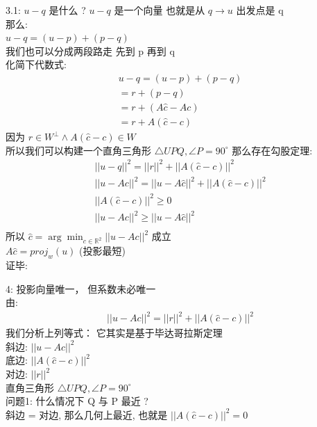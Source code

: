\documentclass[12pt]{article}
\begin{document}
\begin{flushleft}
    3.1: $u -q$ 是什么 ?
    $u - q$ 是一个向量 也就是从 $q \to u $ 出发点是 q \\
    那么: \\
    $u - q = (u - p)  + (p - q) $  \\
    我们也可以分成两段路走 先到 p 再到 q \\
    化简下代数式: \\
    \begin{align}
        u - q = (u - p)  + (p - q) \\
        = r + (p - q)              \\
        = r + (A\hat{c} - Ac)      \\
        = r + A(\hat{c} - c)
    \end{align}
    因为 $r \in W^{\perp} \land A(\hat{c} - c) \in W$ \\
    所以我们可以构建一个直角三角形 $\triangle UPQ, \angle P=90^\circ $
    那么存在勾股定理: \\
    \begin{align}
        ||u - q||^{2} = ||r||^{2} + ||A(\hat{c} - c)||^{2}             \\
        ||u - Ac||^{2} = ||u - A\hat{c}||^{2} + ||A(\hat{c} - c)||^{2} \\
        ||A(\hat{c} - c)||^{2} \geq 0                                  \\
        ||u - Ac||^{2} \geq ||u - A\hat{c}||^{2}                       \\
    \end{align}
    所以 $ \hat{c} = \arg \min_{c \in \mathbb{R}^{2}} ||u - Ac||^{2}$ 成立 \\
    $A\hat{c} = proj_{w}(u)$ (投影最短)\\
    证毕:


    4: 投影向量唯一， 但系数未必唯一 \\
    由:
    \begin{align}
        ||u - Ac||^{2} = ||r||^{2} + ||A(\hat{c}-c)||^{2}
    \end{align}
    我们分析上列等式： 它其实是基于毕达哥拉斯定理 \\
    斜边: $||u - Ac||^{2}$ \\
    底边: $||A(\hat{c}-c)||^{2}$ \\
    对边: $||r||^{2}$ \\
    直角三角形 $\triangle UPQ, \angle P=90^\circ $ \\
    问题1: 什么情况下 Q 与 P 最近 ? \\
    斜边 = 对边, 那么几何上最近, 也就是 $||A(\hat{c}-c)||^{2} = 0$


\end{flushleft}
\end{document}
